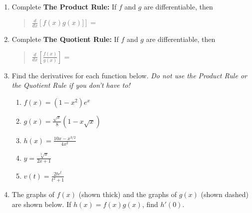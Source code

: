 \documentclass[11pt,fleqn]{article}
\begin{document}
\setlength{\parindent}{0cm}
\renewcommand{\headrulewidth}{0pt}
\newcommand{\blank}[1]{\rule{#1}{0.75pt}}
\renewcommand{\d}{\displaystyle}
\vspace*{-0.7in}
\begin{center}
 {\large{ }}
\end{center}
\begin{enumerate}

\item Complete \textbf{The Product Rule:} If $f$ and $g$ are differentiable, then 
\begin{quote}  $\d{\frac{d}{dx} \left[f(x) g(x)]\right] =} $ \end{quote}
\vspace{.2in}

\item Complete \textbf{The Quotient Rule:}  If $f$ and $g$ are differentiable, then
\begin{quote} 
$\frac{d}{dx} \left[ \frac{f(x)}{g(x)} \right] = $ \end{quote}
\vspace{.2in}
\item Find the derivatives for each function below. \emph{Do not use the Product Rule or the Quotient Rule  if you don't have to!}
	\begin{enumerate}
	\item $\d{f(x)=(1-x^2)e^x}$
	\vfill
	\item $\d{g(x)=\frac{\sqrt{x}}{8}(1-x\sqrt{x})}$
	\vfill
	\item $\d{h(x)=\frac{10x-x^{3/2}}{4x^2}}$
	\vfill
	\newpage
	\item $\d{y=\frac{\sqrt[3]{x}}{2x+1}}$
	\vfill
	\item $\d{v(t)=\frac{2te^t}{t^2+1}}$
	\vfill
	\end{enumerate}
\item   The graphs of $f(x)$ (shown thick) and the graphs of $g(x)$ (shown dashed) are shown below. If $h(x) = f(x)g(x)$, find $h'(0)$.

  \begin{flushleft}


\end{flushleft}
\end{enumerate}
\end{document}
